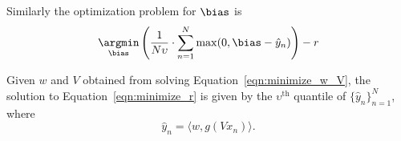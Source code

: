 Similarly the optimization problem for $\bias$ is
\begin{equation}
\label{eqn:minimize_r}
\underset{\bias}{\argmin} \left( \frac{1}{N\upsilon} \cdot \sum_{n = 1}^N \max( 0, \bias - \hat{y}_n ) \right) - r
\end{equation}
\begin{comment}
\begin{enumerate}[(1)]
	\item Initialise $w^{(0)}, V^{(0)}, r^{(0)}$ randomly
	\item for $t = 1, 2, \ldots$
	\begin{enumerate}[(a)]
		\item find $(w^{(t+1)}, V^{(t+1)})$ that minimise the objective through Backpropagation (BP) algorithm.
		\begin{equation}
		\label{eqn:minimize_w_V}
		 \underset{w, V}{\argmin} \frac{1}{2} \| w \|_{2}^2 + \frac{1}{2} \| V \|_F^2 + \frac{1}{\upsilon} \cdot \frac{1}{N} \sum_{n = 1}^N \ell( y_n, \hat{y}_n( w, V ) )
		 \end{equation}
		where
		\begin{align*}
			\ell( y, \hat{y} ) &= \max( 0, y - \hat{y} ) \\
			y_n       &= \bias^{(t)} \\
			\hat{y}_n( w, V ) &= \langle w, g( V x_n ) \rangle
		\end{align*}

		\item pick $\bias^{(t)}$ to be the $\upsilon^{\text{th}}$ quantile of $\{ \hat{y}_n \}_{n = 1}^N$, where
		$$ \hat{y}_n^{(t+1)} = \langle w^{(t+1)}, g( V^{(t+1)} x_n ) \rangle. $$
	\end{enumerate}

\end{enumerate}

To justify step 2(b), let us observe that the optimisation with respect to $\bias$ is\\
%
\begin{equation}
\label{eqn:minimize_r}
\underset{\bias}{\argmin} \left( \frac{1}{N\upsilon} \cdot \sum_{n = 1}^N \max( 0, \bias - \hat{y}_n ) \right) - r
\end{equation}
\end{comment}
\begin{theorem}
Given $w$ and $V$ obtained from solving Equation~\ref{eqn:minimize_w_V}, the solution to Equation~\ref{eqn:minimize_r} is given
by the $\upsilon^{\text{th}}$ quantile of $\{ \hat{y}_n \}_{n = 1}^N$, where
                $$ \hat{y}_n = \langle w, g(V x_n ) \rangle. $$
\end{theorem}
